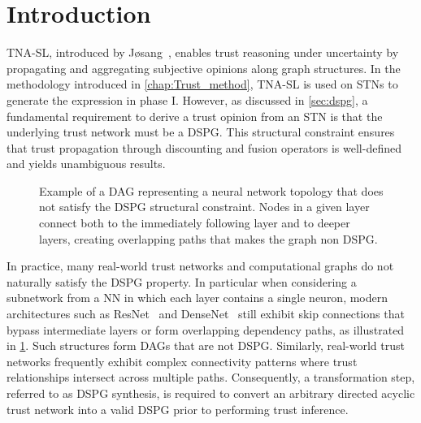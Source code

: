 \section{Introduction}
\acf{TNA-SL}, introduced by J{\o}sang~\cite{10.5555/1151699.1151710}, enables trust reasoning under uncertainty by propagating and aggregating subjective opinions along graph structures. In the methodology introduced in \cref{chap:Trust_method}, \ac{TNA-SL} is used on \acp{STN} to generate the expression in phase I. However, as discussed in \cref{sec:dspg}, a fundamental requirement to derive a trust opinion from an \ac{STN} is that the underlying trust network must be a \ac{DSPG}. This structural constraint ensures that trust propagation through discounting and fusion operators is well-defined and yields unambiguous results.
\begin{figure}
    \centering
    \caption{Example of a \ac{DAG} representing a neural network topology that does not satisfy the \ac{DSPG} structural constraint. Nodes in a given layer connect both to the immediately following layer and to deeper layers, creating overlapping paths that makes the graph non \ac{DSPG}.}
    \label{fig:on_dspg_NN}
\end{figure}

In practice, many real-world trust networks and computational graphs do not naturally satisfy the \ac{DSPG} property. In particular when considering a subnetwork from a \ac{NN} in which each layer contains a single neuron, modern architectures such as ResNet~\cite{he2015deepresiduallearningimage} and DenseNet~\cite{huang2018denselyconnectedconvolutionalnetworks} still exhibit skip connections that bypass intermediate layers or form overlapping dependency paths, as illustrated in \cref{fig:on_dspg_NN}. Such structures form \acp{DAG} that are not \ac{DSPG}. Similarly, real-world trust networks frequently exhibit complex connectivity patterns where trust relationships intersect across multiple paths. Consequently, a transformation step, referred to as \ac{DSPG} synthesis, is required to convert an arbitrary directed acyclic trust network into a valid \ac{DSPG} prior to performing trust inference.

